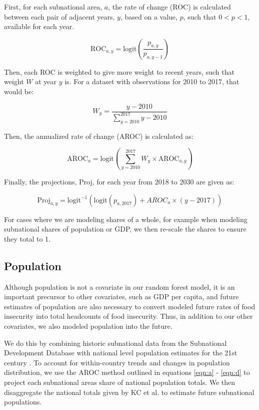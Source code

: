 \documentclass{article}
\begin{document}
First, for each subnational area, $a$, the rate of change (ROC) is calculated between each pair of adjacent years, $y$, based on a value, $p$, such that $0 < p < 1$, available for each year.

\begin{equation}
  \text{ROC}_{a,y} = \text{logit} \left( \frac{p_{a,y}}{p_{a,y-1}} \right)
  \label{eqn:a}
\end{equation}

Then, each ROC is weighted to give more weight to recent years, such that weight $W$ at year $y$ is.  For a dataset with observations for 2010 to 2017, that would be:

\begin{equation}
  W_y = \frac{y - 2010}{\sum_{y=2010}^{2017} y - 2010}
  \label{eqn:b}
\end{equation}

Then, the annualized rate of change (AROC) is calculated as:

\begin{equation}
  \text{AROC}_{a} = \text{logit} \left( \sum_{y=2010}^{2017} W_y \times \text{AROC}_{a, y} \right)
  \label{eqn:c}
\end{equation}

Finally, the projections, Proj, for each year from 2018 to 2030 are given as:

\begin{equation}
  \text{Proj}_{a,y} = \text{logit}^{-1} ( \text{logit} ( p_{a,2017} ) + AROC_{a} \times ( y - 2017 ) )
  \label{eqn:d}
\end{equation}

For cases where we are modeling shares of a whole, for example when modeling subnational shares of population or GDP, we then re-scale the shares to ensure they total to 1.

\subsection{Population}
Although population is not a covariate in our random forest model, it is an important precursor to other covariates, such as GDP per capita, and future estimates of population are also necessary to convert modeled future rates of food insecurity into total headcounts of food insecurity.  Thus, in addition to our other covariates, we also modeled population into the future.

We do this by combining historic subnational data from the Subnational Development Database \citep{Smits2019} with national level population estimates for the 21st century \citep{KC2017}.  To account for within-country trends and changes in population distribution, we use the AROC method outlined in equations \ref{eqn:a} - \ref{eqn:d} to project each subnational areas share of national population totals. We then disaggregate the national totals given by KC et al. to estimate future subnational populations.
\end{document}
